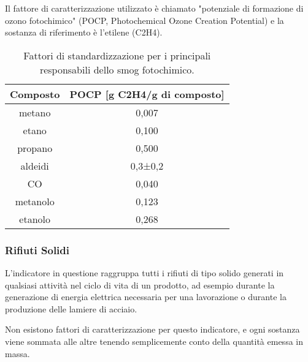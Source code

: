 Il fattore di caratterizzazione utilizzato è chiamato "potenziale di formazione di ozono fotochimico" (POCP, Photochemical Ozone Creation Potential) e la sostanza di riferimento è l'etilene (C2H4).
\begin{table}[!ht]
    \centering
    \begin{tabular}{|| c | c ||} %
        \hline
        \textbf{Composto} &\textbf{POCP [g C2H4/g di composto]} \\
        \hline\hline
        metano	&0,007\\
        \hline
        etano	&0,100\\
        \hline
        propano	&0,500\\
        \hline
        aldeidi	&0,3±0,2\\
        \hline
        CO	&0,040\\
        \hline
        metanolo	&0,123\\
        \hline
        etanolo	&0,268\\
        \hline
    \end{tabular}
    \caption{Fattori di standardizzazione per i principali responsabili dello smog fotochimico.}
    \label{tabellaFattoriPhotoSmog}
\end{table}
	

\subsubsection*{Rifiuti Solidi}
L'indicatore in questione raggruppa tutti i rifiuti di tipo solido generati in qualsiasi attività nel ciclo di vita di un prodotto, ad esempio durante la generazione di energia elettrica necessaria per una lavorazione o durante la produzione delle lamiere di acciaio.

Non esistono fattori di caratterizzazione per questo indicatore, e ogni sostanza viene sommata alle altre tenendo semplicemente conto della quantità emessa in massa.